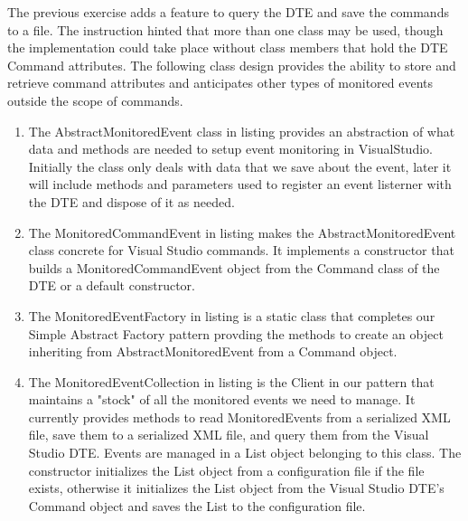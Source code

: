 \begin{Answer}
The previous exercise adds a feature to query the DTE and save the commands to a file.  The instruction hinted that more than one class may be used, though the implementation could take place without class members that hold the DTE Command attributes.  The following class design provides the ability to store and retrieve command attributes and anticipates other types of monitored events outside the scope of commands.
\begin{enumerate}

\item
The AbstractMonitoredEvent class in listing %
 provides an abstraction of what data and methods are needed to setup event monitoring in VisualStudio.  Initially the class only deals with data that we save about the event, later it will include methods and parameters used to register an event listerner with the DTE and dispose of it as needed.
%

\item
The MonitoredCommandEvent in listing %
makes the AbstractMonitoredEvent class concrete for Visual Studio commands.  It implements a constructor that builds a MonitoredCommandEvent object from the Command class of the DTE or a default constructor.  
%

\item
The MonitoredEventFactory in listing %
 is a static class that completes our Simple Abstract Factory pattern provding the methods to create an object inheriting from AbstractMonitoredEvent from a Command object.  
%

\item
The MonitoredEventCollection in listing %
 is the Client in our pattern that maintains a "stock" of all the monitored events we need to manage.  It currently provides methods to read MonitoredEvents from a serialized XML file, save them to a serialized XML file, and query them from the Visual Studio DTE.  Events are managed in a List object belonging to this class.   The constructor initializes the List object from a configuration file if the file exists, otherwise it initializes the List object from the Visual Studio DTE's Command object and saves the List to the configuration file. 
%
\end{enumerate}
\end{Answer}

